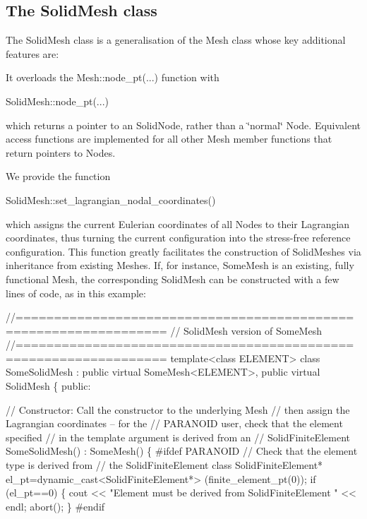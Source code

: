 \hypertarget{index_solid_mesh}{}\subsection{The Solid\+Mesh class}\label{index_solid_mesh}
The {\ttfamily Solid\+Mesh} class is a generalisation of the {\ttfamily Mesh} class whose key additional features are\+:
\begin{DoxyItemize}
\item It overloads the {\ttfamily Mesh\+::node\+\_\+pt}(...) function with 
\begin{DoxyCode}
SolidMesh::node\_pt(...)
\end{DoxyCode}
 which returns a pointer to an {\ttfamily Solid\+Node}, rather than a \char`\"{}normal\char`\"{} {\ttfamily Node}. Equivalent access functions are implemented for all other {\ttfamily Mesh} member functions that return pointers to {\ttfamily Nodes}.
\item We provide the function 
\begin{DoxyCode}
SolidMesh::set\_lagrangian\_nodal\_coordinates()
\end{DoxyCode}
 which assigns the current Eulerian coordinates of all {\ttfamily Nodes} to their Lagrangian coordinates, thus turning the current configuration into the stress-\/free reference configuration. This function greatly facilitates the construction of {\ttfamily Solid\+Meshes} via inheritance from existing {\ttfamily Meshes}. If, for instance, {\ttfamily Some\+Mesh} is an existing, fully functional {\ttfamily Mesh}, the corresponding {\ttfamily Solid\+Mesh} can be constructed with a few lines of code, as in this example\+: 
\begin{DoxyCode}
 \textcolor{comment}{//=================================================================}
 \textcolor{comment}{// SolidMesh version of SomeMesh}
 \textcolor{comment}{//=================================================================}
 \textcolor{keyword}{template}<\textcolor{keyword}{class} ELEMENT>
 \textcolor{keyword}{class }SomeSolidMesh : \textcolor{keyword}{public} \textcolor{keyword}{virtual} SomeMesh<ELEMENT>,
                         \textcolor{keyword}{public} \textcolor{keyword}{virtual} SolidMesh
  \{
    \textcolor{keyword}{public}:

    \textcolor{comment}{// Constructor: Call the constructor to the underlying Mesh}
    \textcolor{comment}{// then assign the Lagrangian coordinates -- for the}
    \textcolor{comment}{// PARANOID user, check that the element specified}
    \textcolor{comment}{// in the template argument is derived from an }
    \textcolor{comment}{// SolidFiniteElement}
    SomeSolidMesh() : SomeMesh()
     \{
\textcolor{preprocessor}{ #ifdef PARANOID}
    \textcolor{comment}{// Check that the element type is derived from}
    \textcolor{comment}{// the SolidFiniteElement class}
    SolidFiniteElement* el\_pt=\textcolor{keyword}{dynamic\_cast<}SolidFiniteElement*\textcolor{keyword}{>}
     (finite\_element\_pt(0));
    \textcolor{keywordflow}{if} (el\_pt==0)
     \{
      cout << \textcolor{stringliteral}{"Element must be derived from SolidFiniteElement "} << endl;
      abort();
     \}
\textcolor{preprocessor}{ #endif}
 

\end{DoxyCode}
\end{DoxyItemize}

